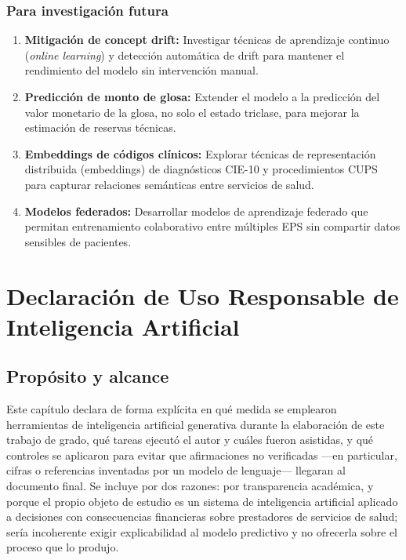 \documentclass[12pt,letterpaper]{report}
\begin{document}
\subsection*{Para investigación futura}

\begin{enumerate}
    \item \textbf{Mitigación de concept drift:} Investigar técnicas de aprendizaje continuo (\textit{online learning}) y detección automática de drift para mantener el rendimiento del modelo sin intervención manual.

    \item \textbf{Predicción de monto de glosa:} Extender el modelo a la predicción del valor monetario de la glosa, no solo el estado triclase, para mejorar la estimación de reservas técnicas.

    \item \textbf{Embeddings de códigos clínicos:} Explorar técnicas de representación distribuida (embeddings) de diagnósticos CIE-10 y procedimientos CUPS para capturar relaciones semánticas entre servicios de salud.

    \item \textbf{Modelos federados:} Desarrollar modelos de aprendizaje federado que permitan entrenamiento colaborativo entre múltiples EPS sin compartir datos sensibles de pacientes.
\end{enumerate}

\chapter{Declaración de Uso Responsable de Inteligencia Artificial}
\label{ch:declaracion_ia}

\section{Propósito y alcance}

Este capítulo declara de forma explícita en qué medida se emplearon herramientas de
inteligencia artificial generativa durante la elaboración de este trabajo de grado, qué
tareas ejecutó el autor y cuáles fueron asistidas, y qué controles se aplicaron para
evitar que afirmaciones no verificadas —en particular, cifras o referencias inventadas
por un modelo de lenguaje— llegaran al documento final. Se incluye por dos razones:
por transparencia académica, y porque el propio objeto de estudio es un sistema de
inteligencia artificial aplicado a decisiones con consecuencias financieras sobre
prestadores de servicios de salud; sería incoherente exigir explicabilidad al modelo
predictivo y no ofrecerla sobre el proceso que lo produjo.
\end{document}
